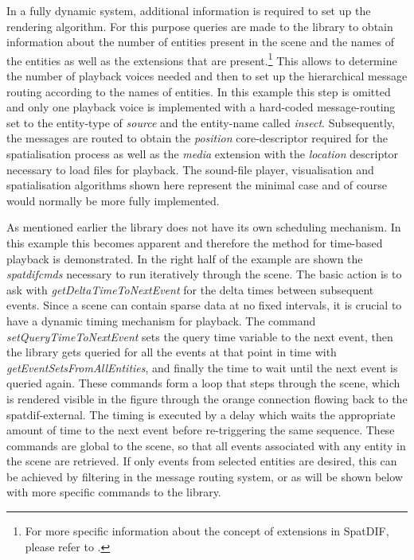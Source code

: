 \documentclass{article}
\begin{document}
In a fully dynamic system, additional information is required to set up the rendering algorithm.
For this purpose queries are made to the library to obtain information about the number of entities present in the scene and the names of the entities as well as the extensions that are present.\footnote{For more specific information about the concept of extensions in SpatDIF, please refer to \cite{SpatDIF_SMC12, Peters:2013SpatDifCMJ, SpatDIF_03}. }
This allows to determine the number of playback voices needed and then to set up the hierarchical message routing according to the names of entities.
In this example this step is omitted and only one playback voice is implemented with a hard-coded message-routing set to the entity-type of \emph{source} and the entity-name called \emph{insect}.
Subsequently, the messages are routed to obtain the \emph{position} core-descriptor required for the spatialisation process as well as the \emph{media} extension with the \emph{location} descriptor necessary to load files for playback.
The sound-file player, visualisation \cite{Schacher_ICMC_2006} and spatialisation algorithms shown here represent the minimal case and of course would normally be more fully implemented. %

As mentioned earlier the library does not have its own scheduling mechanism. 
In this example this becomes apparent and therefore the method for time-based playback is demonstrated.
In the right half of the example are shown the \emph{spatdifcmds} necessary to run iteratively through the scene.
The basic action is to ask with \emph{getDeltaTimeToNextEvent} for the delta times between subsequent events.
Since a scene can contain sparse data at no fixed intervals, it is crucial to have a dynamic timing mechanism for playback.
The command \emph{setQueryTimeToNextEvent} sets the query time variable to the next event, then the library gets queried for all the events at that point in time with \emph{getEventSetsFromAllEntities}, and finally the time to wait until the next event is queried again.
These commands form a loop that steps through the scene, which is rendered visible in the figure through the orange connection flowing back to the spatdif-external.
The timing is executed by a delay which waits the appropriate amount of time to the next event before re-triggering the same sequence.
These commands are global to the scene, so that all events associated with any entity in the scene are retrieved.
If only events from selected entities are desired, this can be achieved by filtering in the message routing system, or as will be shown below with more specific commands to the library. %
\end{document}
